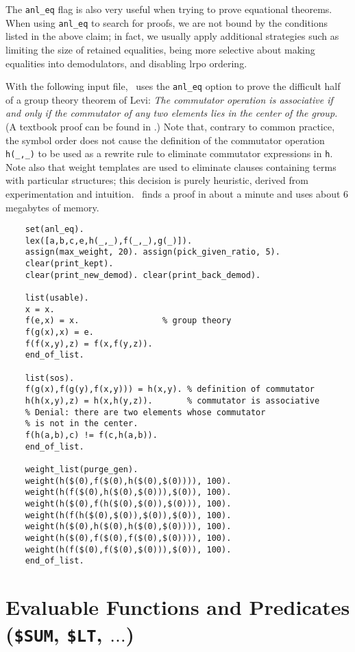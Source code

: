 \documentclass[11pt]{article}
\begin{document}
The \verb:anl_eq: flag
is also very useful when trying to prove
equational theorems.  When using
\verb:anl_eq: to search for proofs, we are not bound by the
conditions listed in the above claim; in fact, we usually apply
additional strategies such as limiting the size of retained
equalities, being more selective about making equalities into
demodulators, and disabling {\sc lrpo} ordering.

With the following input file, \otter\ uses the \verb:anl_eq:
option to prove the difficult half of a group theory theorem of Levi:
{\it The commutator operation is associative if and only if the
commutator of any two elements lies in the center of the group.}  (A
textbook proof can be found in \cite{kurosh}.)  Note that,
contrary to common practice, the symbol
order does not cause the definition of the commutator operation
\verb:h(_,_): to be used as a rewrite rule to eliminate commutator
expressions in \verb:h:.  Note also that weight templates are used to
eliminate clauses containing terms with particular structures; this
decision is purely heuristic, derived from experimentation and
intuition.  \otter\ finds a proof in about a minute
and uses about 6 megabytes of memory.

{\small
\begin{verbatim}
    set(anl_eq).
    lex([a,b,c,e,h(_,_),f(_,_),g(_)]).
    assign(max_weight, 20). assign(pick_given_ratio, 5).
    clear(print_kept).
    clear(print_new_demod). clear(print_back_demod).

    list(usable).
    x = x.
    f(e,x) = x.                 % group theory
    f(g(x),x) = e.
    f(f(x,y),z) = f(x,f(y,z)).
    end_of_list.

    list(sos).
    f(g(x),f(g(y),f(x,y))) = h(x,y). % definition of commutator
    h(h(x,y),z) = h(x,h(y,z)).       % commutator is associative
    % Denial: there are two elements whose commutator
    % is not in the center.
    f(h(a,b),c) != f(c,h(a,b)).
    end_of_list.

    weight_list(purge_gen).
    weight(h($(0),f($(0),h($(0),$(0)))), 100).
    weight(h(f($(0),h($(0),$(0))),$(0)), 100).
    weight(h($(0),f(h($(0),$(0)),$(0))), 100).
    weight(h(f(h($(0),$(0)),$(0)),$(0)), 100).
    weight(h($(0),h($(0),h($(0),$(0)))), 100).
    weight(h($(0),f($(0),f($(0),$(0)))), 100).
    weight(h(f($(0),f($(0),$(0))),$(0)), 100).
    end_of_list.
\end{verbatim}
}

\section{Evaluable Functions and Predicates ({\tt \$SUM}, {\tt \$LT}, $\ldots$)} \label{eval}
\end{document}
